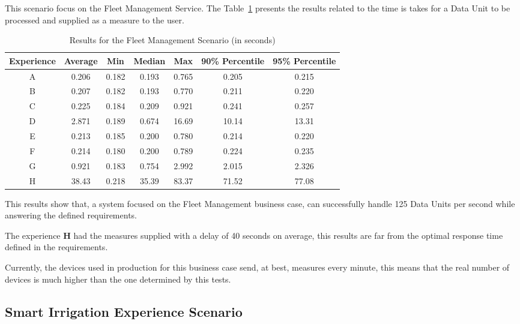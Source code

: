 This scenario focus on the Fleet Management Service. The Table~\ref{tab:evaluation:experiences:fleet:results} presents the results related to the time is takes for a Data Unit to be processed and supplied as a measure to the user.

\begin{table}[H]
    \centering
    \begin{tabular}{@{}ccccccc@{}}
    \toprule
    \textbf{Experience} & \textbf{Average} & \textbf{Min} & \textbf{Median} & \textbf{Max} & \textbf{90\% Percentile} & \textbf{95\% Percentile} \\ \midrule
    A & 0.206 & 0.182 & 0.193 & 0.765 & 0.205 & 0.215 \\ \midrule
    B & 0.207 & 0.182 & 0.193 & 0.770 & 0.211 & 0.220 \\ \midrule
    C & 0.225 & 0.184 & 0.209 & 0.921 & 0.241 & 0.257 \\ \midrule
    D & 2.871 & 0.189 & 0.674 & 16.69 & 10.14 & 13.31 \\ \midrule
    E & 0.213 & 0.185 & 0.200 & 0.780 & 0.214 & 0.220 \\ \midrule
    F & 0.214 & 0.180 & 0.200 & 0.789 & 0.224 & 0.235 \\ \midrule
    G & 0.921 & 0.183 & 0.754 & 2.992 & 2.015 & 2.326 \\ \midrule
    H & 38.43 & 0.218 & 35.39 & 83.37 & 71.52 & 77.08 \\ \bottomrule
    \end{tabular}
    \caption{Results for the Fleet Management Scenario (in seconds)}
    \label{tab:evaluation:experiences:fleet:results}
\end{table}

This results show that, a system focused on the Fleet Management business case, can successfully handle 125 Data Units per second while answering the defined requirements. 

The experience \textbf{H} had the measures supplied with a delay of 40 seconds on average, this results are far from the optimal response time defined in the requirements.

Currently, the devices used in production for this business case send, at best, measures every minute, this means that the real number of devices is much higher than the one determined by this tests.

\subsection{Smart Irrigation Experience Scenario}
\label{subsec:evaluation:experiences:irrigation}

